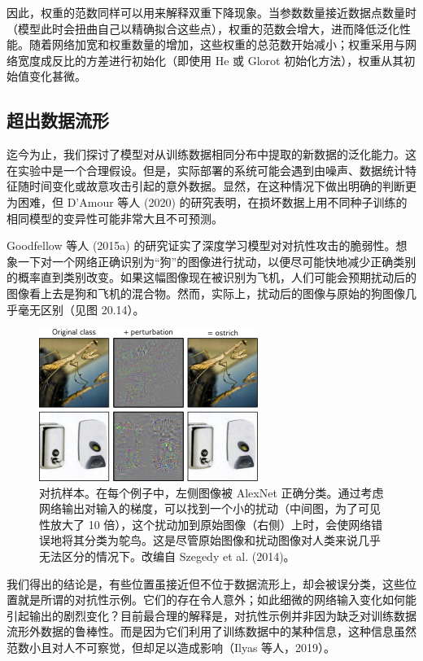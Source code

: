 因此，权重的范数同样可以用来解释双重下降现象。当参数数量接近数据点数量时（模型此时会扭曲自己以精确拟合这些点），权重的范数会增大，进而降低泛化性能。随着网络加宽和权重数量的增加，这些权重的总范数开始减小；权重采用与网络宽度成反比的方差进行初始化（即使用 He 或 Glorot 初始化方法），权重从其初始值变化甚微。

\subsection{超出数据流形}
迄今为止，我们探讨了模型对从训练数据相同分布中提取的新数据的泛化能力。这在实验中是一个合理假设。但是，实际部署的系统可能会遇到由噪声、数据统计特征随时间变化或故意攻击引起的意外数据。显然，在这种情况下做出明确的判断更为困难，但 D’Amour 等人 (2020) 的研究表明，在损坏数据上用不同种子训练的相同模型的变异性可能非常大且不可预测。

Goodfellow 等人 (2015a) 的研究证实了深度学习模型对对抗性攻击的脆弱性。想象一下对一个网络正确识别为“狗”的图像进行扰动，以便尽可能快地减少正确类别的概率直到类别改变。如果这幅图像现在被识别为飞机，人们可能会预期扰动后的图像看上去是狗和飞机的混合物。然而，实际上，扰动后的图像与原始的狗图像几乎毫无区别（见图 20.14）。

\begin{figure}[ht!]
\centering
\includegraphics[width=0.7\linewidth]{png/chapter20/WhyAdversarial.png}
\caption{对抗样本。在每个例子中，左侧图像被 AlexNet 正确分类。通过考虑网络输出对输入的梯度，可以找到一个小的扰动（中间图，为了可见性放大了 10 倍），这个扰动加到原始图像（右侧）上时，会使网络错误地将其分类为鸵鸟。这是尽管原始图像和扰动图像对人类来说几乎无法区分的情况下。改编自 Szegedy et al. (2014)。}
\end{figure}

我们得出的结论是，有些位置虽接近但不位于数据流形上，却会被误分类，这些位置就是所谓的对抗性示例。它们的存在令人意外；如此细微的网络输入变化如何能引起输出的剧烈变化？目前最合理的解释是，对抗性示例并非因为缺乏对训练数据流形外数据的鲁棒性。而是因为它们利用了训练数据中的某种信息，这种信息虽然范数小且对人不可察觉，但却足以造成影响（Ilyas 等人，2019）。

